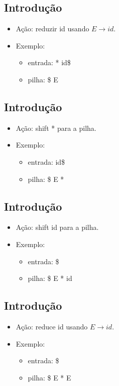 \documentclass[11pt]{article}
\begin{document}
\subsection*{Introdução}
\label{sec:orgbdba4d5}

\begin{itemize}
\item Ação: reduzir id usando \(E \to id\).

\item Exemplo:
\begin{itemize}
\item entrada: * id\$
\item pilha: \$ E
\end{itemize}
\end{itemize}
\subsection*{Introdução}
\label{sec:org5e36856}

\begin{itemize}
\item Ação: shift * para a pilha.

\item Exemplo:
\begin{itemize}
\item entrada: id\$
\item pilha: \$ E *
\end{itemize}
\end{itemize}
\subsection*{Introdução}
\label{sec:org21469ad}

\begin{itemize}
\item Ação: shift id para a pilha.

\item Exemplo:
\begin{itemize}
\item entrada: \$
\item pilha: \$ E * id
\end{itemize}
\end{itemize}
\subsection*{Introdução}
\label{sec:org74d4882}

\begin{itemize}
\item Ação: reduce id usando \(E\to id\).

\item Exemplo:
\begin{itemize}
\item entrada: \$
\item pilha: \$ E * E
\end{itemize}
\end{itemize}
\end{document}
